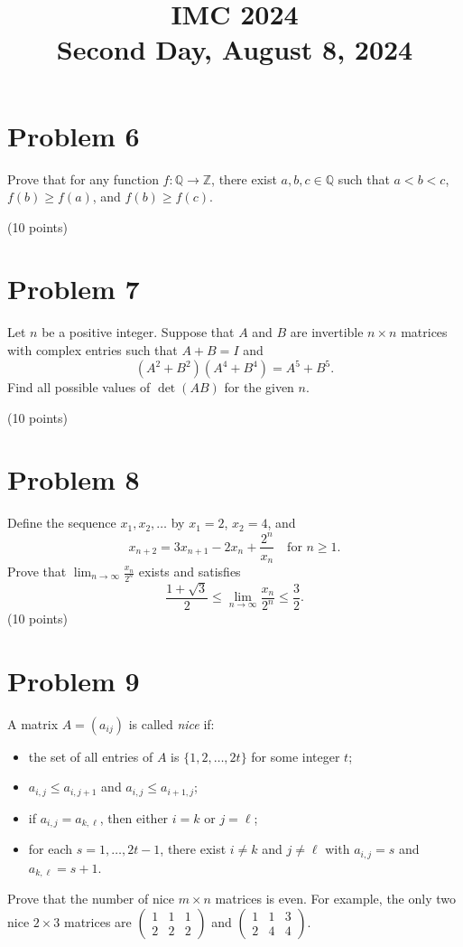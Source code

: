 \documentclass{article}
\title{IMC 2024 \\ Second Day, August 8, 2024}
\date{}
\begin{document}
\maketitle

\section*{Problem 6}
Prove that for any function $f: \mathbb{Q} \to \mathbb{Z}$, there exist $a, b, c \in \mathbb{Q}$ such that $a < b < c$, $f(b) \geq f(a)$, and $f(b) \geq f(c)$.

(10 points)

\section*{Problem 7}
Let $n$ be a positive integer. Suppose that $A$ and $B$ are invertible $n \times n$ matrices with complex entries such that $A + B = I$ and
\[
(A^2 + B^2)(A^4 + B^4) = A^5 + B^5.
\]
Find all possible values of $\det(AB)$ for the given $n$.

(10 points)

\section*{Problem 8}
Define the sequence $x_1, x_2, \ldots$ by $x_1 = 2$, $x_2 = 4$, and
\[
x_{n+2} = 3 x_{n+1} - 2 x_n + \frac{2^n}{x_n} \quad \text{for } n \geq 1.
\]
Prove that $\lim_{n \to \infty} \frac{x_n}{2^n}$ exists and satisfies
\[
\frac{1 + \sqrt{3}}{2} \leq \lim_{n \to \infty} \frac{x_n}{2^n} \leq \frac{3}{2}.
\]
(10 points)

\section*{Problem 9}
A matrix $A = (a_{ij})$ is called \emph{nice} if:
\begin{itemize}
\item[(i)] the set of all entries of $A$ is $\{1, 2, \ldots, 2t\}$ for some integer $t$;
\item[(ii)] $a_{i,j} \leq a_{i,j+1}$ and $a_{i,j} \leq a_{i+1,j}$;
\item[(iii)] if $a_{i,j} = a_{k,\ell}$, then either $i = k$ or $j = \ell$;
\item[(iv)] for each $s = 1, \ldots, 2t-1$, there exist $i \neq k$ and $j \neq \ell$ with $a_{i,j} = s$ and $a_{k,\ell} = s+1$.
\end{itemize}
Prove that the number of nice $m \times n$ matrices is even. For example, the only two nice $2 \times 3$ matrices are $\begin{pmatrix} 1 & 1 & 1 \\ 2 & 2 & 2 \end{pmatrix}$ and $\begin{pmatrix} 1 & 1 & 3 \\ 2 & 4 & 4 \end{pmatrix}$.
\end{document}
